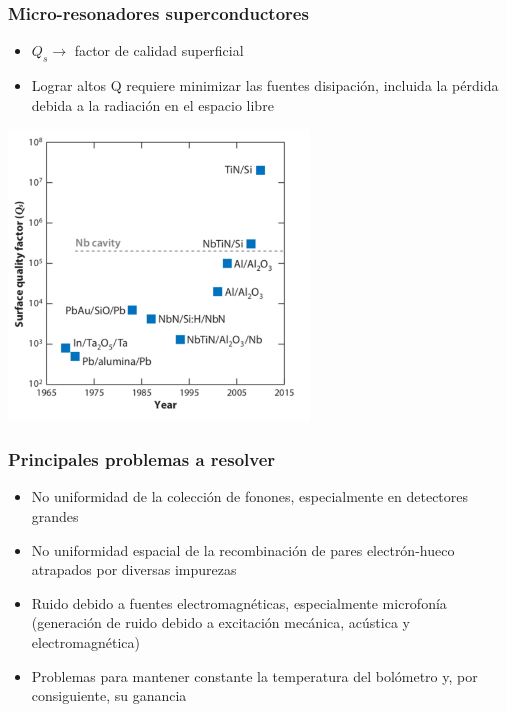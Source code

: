 \documentclass{beamer}
\begin{document}
\begin{frame}
				\frametitle{Micro-resonadores superconductores}
				\begin{itemize}
								\item $Q_s \to$ factor de calidad superficial\\
								\item Lograr altos Q requiere minimizar las fuentes disipación,
												incluida la pérdida debida a la radiación en el espacio
												libre
				\end{itemize}
								\begin{center}
												\includegraphics[height=0.68\textheight,width=0.6\textwidth]{microresonadores_sc}
								\end{center}
\end{frame} 


\begin{frame}
				\frametitle{Principales problemas a resolver}
				\begin{itemize}
								\item \alert{No uniformidad de la colección de
												fonones}, especialmente en
								detectores grandes
				\item No uniformidad espacial de la
								recombinación de pares
								electrón-hueco atrapados
								por diversas impurezas
				\item \alert{Ruido} debido a fuentes
								electromagnéticas, especialmente
																microfonía (generación de ruido
																				debido a excitación mecánica,
																acústica y electromagnética)
												\item \alert{Problemas para mantener constante
																la temperatura del bolómetro} y,
												por consiguiente, su \alert{ganancia}
				\end{itemize}
\end{frame}
\end{document}
